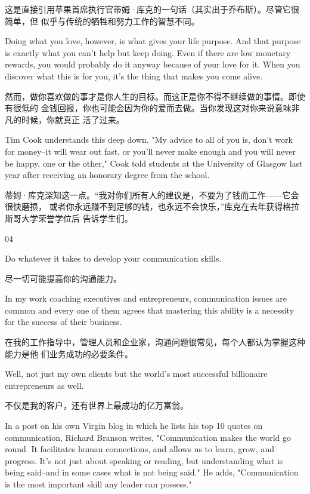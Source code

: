 \documentclass[11pt]{ctexart}
\begin{document}
{{{{这是直接引用苹果首席执行官蒂姆·库克的一句话（其实出于乔布斯）。尽管它很简单，但
似乎与传统的牺牲和努力工作的智慧不同。

Doing what you love, however, is what gives your life purpose. And that purpose
is exactly what you can't help but keep doing. Even if there are low monetary
rewards, you would probably do it anyway because of your love for it. When you
discover what this is for you, it's the thing that makes you come alive.

然而，做你喜欢做的事才是你人生的目标。而这正是你不得不继续做的事情。即使有很低的
金钱回报，你也可能会因为你的爱而去做。当你发现这对你来说意味非凡的时候，你就真正
活了过来。

Tim Cook understands this deep down. "My advice to all of you is, don't work for
money--it will wear out fast, or you'll never make enough and you will never be
happy, one or the other," Cook told students at the University of Glasgow last
year after receiving an honorary degree from the school.

蒂姆·库克深知这一点。“我对你们所有人的建议是，不要为了钱而工作——它会很快磨损，
或者你永远赚不到足够的钱，也永远不会快乐，”库克在去年获得格拉斯哥大学荣誉学位后
告诉学生们。

04

Do whatever it takes to develop your communication skills.

尽一切可能提高你的沟通能力。



In my work coaching executives and entrepreneurs, communication issues are
common and every one of them agrees that mastering this ability is a necessity
for the success of their business.

在我的工作指导中，管理人员和企业家，沟通问题很常见，每个人都认为掌握这种能力是他
们业务成功的必要条件。

Well, not just my own clients but the world's most successful billionaire
entrepreneurs as well.

不仅是我的客户，还有世界上最成功的亿万富翁。

In a post on his own Virgin blog in which he lists his top 10 quotes on
communication, Richard Branson writes, "Communication makes the world go round.
It facilitates human connections, and allows us to learn, grow, and progress.
It's not just about speaking or reading, but understanding what is being
said--and in some cases what is not being said." He adds, "Communication is the
most important skill any leader can possess."

}}}}
\end{document}
